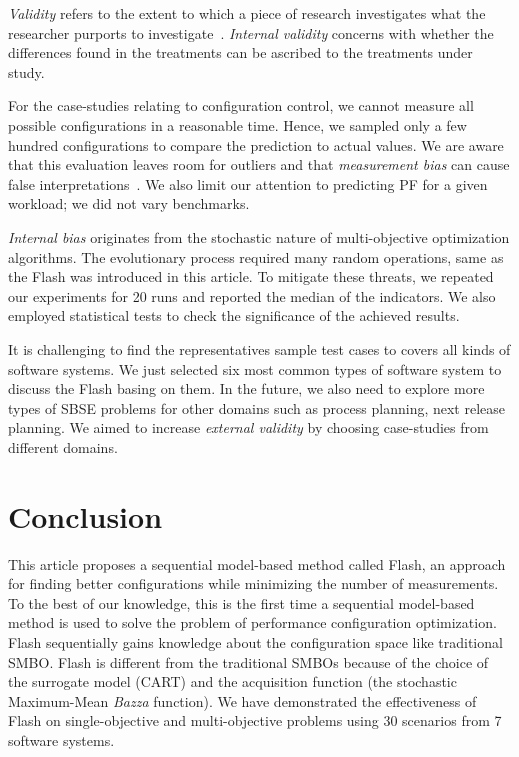 \documentclass[10pt,journal,compsoc]{IEEEtran}
\newcommand{\flash}{{\sc Flash}\xspace}
\begin{document}
{\em Validity} refers to the extent to which a piece of research
investigates what the researcher purports to investigate~\cite{SSA15}.
{\em Internal validity} concerns with whether the differences found in
the treatments can be ascribed to the treatments under study. 

For the case-studies relating to configuration control, we cannot measure all possible configurations in a reasonable time. Hence, we sampled only a few hundred configurations to compare the prediction to actual values. We are aware that this evaluation leaves room for outliers and that \textit{measurement bias} can cause false interpretations~\cite{me12d}. We also limit our attention to predicting PF for a given workload; we did not vary benchmarks.

\textit{Internal bias} originates from the stochastic nature of multi-objective optimization algorithms. The evolutionary process required many
random operations, same as the \flash was introduced in this article.
To mitigate these threats, we repeated our experiments for 20 runs
and reported the median of the indicators. We also employed
statistical tests to check the significance of the achieved results.

It is challenging to find the representatives sample test cases to covers all kinds of software systems. We just selected six most
common types of software system to discuss the \flash basing on
them. In the future, we also need to explore more types of SBSE
problems for other domains such as process planning, next release planning. We aimed to increase {\em external validity} by choosing case-studies from different domains. 

\section{Conclusion}

This article proposes a sequential model-based method called \flash, an approach for finding better configurations while minimizing the number of measurements. To the best of our knowledge, this is the first time a sequential model-based method is used to solve the problem of performance configuration optimization. \flash sequentially gains knowledge about the configuration space like traditional SMBO. \flash is different from the traditional SMBOs because of the choice of the surrogate model (CART) and the acquisition function (the stochastic Maximum-Mean {\em Bazza} function). We have demonstrated the effectiveness of \flash on single-objective and multi-objective problems using 30 scenarios from 7 software systems.
\end{document}
